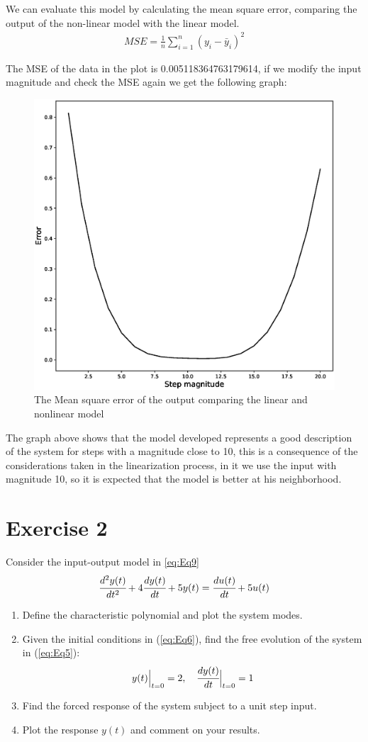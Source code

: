 \documentclass[a4paper,11pt]{article}
\begin{document}
\par We can evaluate this model by calculating the mean square error, comparing the output of the non-linear model with the linear model.
\begin{align*}
MSE = \frac{1}{n}\sum_{i=1}^n(y_i-\bar{y}_i)^2
\end{align*}
\par The MSE of the data in the plot is 0.005118364763179614, if we modify the input magnitude and check the MSE again we get the following graph:
\begin{figure}[H]
\centering
\includegraphics[width=0.4\columnwidth]{Figures/Question1/Error.eps}
\caption{The Mean square error of the output comparing the linear and nonlinear model}
\end{figure} 
\par The graph above shows that the model developed represents a good description of the system for steps with a magnitude close to 10, this is a consequence of the considerations taken in the linearization process, in it we use the input with magnitude 10, so it is expected that the model is better at his neighborhood.
\section*{Exercise 2} 
Consider the input-output model in \ref{eq:Eq9}
\begin{equation}
\cfrac{d^2y(t)}{dt^2}+4\cfrac{dy(t)}{dt}+5y(t)=\cfrac{du(t)}{dt}+5u(t)
\label{eq:Eq9}
\end{equation} 
\begin{enumerate}
\item Define the characteristic polynomial and plot the system modes.
\item Given the initial conditions in (\ref{eq:Eq6}), find the free evolution of the system in (\ref{eq:Eq5}):
\begin{equation}
y(t)\Big\vert_{t=0}=2, \quad \cfrac{dy(t)}{dt}\Big\vert_{t=0}=1
\label{eq:Eq10}
\end{equation}
\item Find the forced response of the system subject to a unit step input.
\item Plot the response $y(t)$ and comment on your results.
\end{enumerate}
\end{document}
